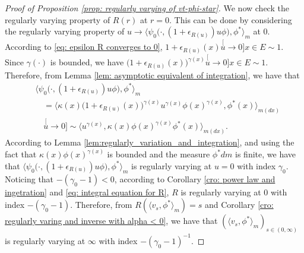 \begin{proof}[Proof of Proposition \ref{prop: regularly varying of vt-phi-star}]
	We now check the regularly varying property of $R(r)$ at $r=0$.
	This can be done by considering the regularly varying property of $u\to \big\langle \psi_0 \big(\cdot ,( 1 + \epsilon_{R(u)} ) u \phi \big), \phi^* \big\rangle_m$ at 0.
    According to \eqref{eq: epsilon R converges to 0},  $1+ \epsilon_{R(u)}(x) \stackrel[u\to 0]{x\in E}{\sim} 1$.
    Since $\gamma(\cdot)$ is bounded, we have $\big(1+ \epsilon_{R(u)}(x)\big)^{\gamma(x)}\stackrel[u\to 0]{x\in E}{\sim} 1$.
	Therefore, from Lemma \ref{lem: asymptotic equivalent of integration}, we have that
\begin{align}\label{eq: regularly part in the integration}
	&\big\langle \psi_0 \big(\cdot,( 1 + \epsilon_{R(u)} ) u \phi \big), \phi^* \big\rangle_m
	\\&\quad = \big\langle \kappa (x)\big( 1 + \epsilon_{R(u)}(x)\big )^{\gamma(x)} u^{\gamma(x)} \phi(x)^{\gamma(x)} , \phi^*(x) \big\rangle_{m(dx)}
	\\ &\quad \stackrel[u\to 0]{}{\sim} \langle u^{\gamma(x)} , \kappa (x)\phi(x)^{\gamma(x)} \phi^*(x) \rangle_{m(dx)}.
\end{align}
	According to Lemma \ref{lem:regularly_variation_and_integration},
	and using the fact that $\kappa(x)\phi(x)^{\gamma(x)}$ is bounded and the measure $\phi^* dm$ is finite,
	we have that $\langle \psi_0\big(\cdot,(1+\epsilon_{R(u)})u\phi \big), \phi^* \rangle_m$ is regularly varying at $u = 0$ with index $\gamma_0$.
	Noticing that $-(\gamma_0 - 1) < 0$,
	according to Corollary \ref{cro: power law and ingetration} and \eqref{eq: integral equation for R}, $R$ is regularly varying at $0$ with index $-(\gamma_0 - 1)$.
	Therefore, from $R(\langle v_s, \phi^*\rangle_m) = s$ and Corollary \ref{cro: regularly varing and inverse with alpha < 0}, we have that $(\langle v_s, \phi^*\rangle_m)_{s\in (0,\infty)}$ is regularly varying at $\infty$ with index $-(\gamma_0 - 1)^{-1}$.
	

\end{proof}

